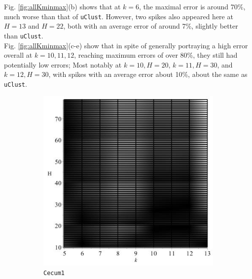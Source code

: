 \documentclass[../../main.tex]{subfiles}
\begin{document}
Fig. \ref{fig:allKminmax}(b) shows that at $k=6$, the maximal error is around 70\%, much worse than that of \texttt{uClust}. However, two spikes also appeared here at $H=13$ and $H=22$, both with an average error of around 7\%, slightly better than \texttt{uClust}.\\

Fig. \ref{fig:allKminmax}(c-e) show that in spite of generally portraying a high error overall at $k=10,11,12$, reaching maximum errors of over 80\%, they still had potentially low errors; Most notably at $k=10,H=20$, $k=11,H=30$, and $k=12,H=30$, with spikes with an average error about 10\%, about the same as \texttt{uClust}.\\

\begin{figure}[H]
\begin{subfigure}[b]{.5\textwidth}
\includegraphics[width=\textwidth]{precision/minmax/cecum1precise}
\caption{\texttt{Cecum1}}
\end{subfigure}
\begin{subfigure}[b]{.5\textwidth}

\end{subfigure}
\end{figure}
\end{document}
